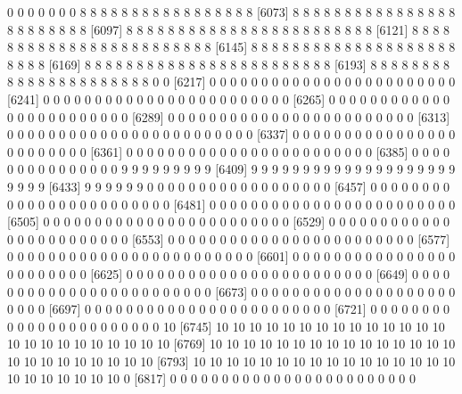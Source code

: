 \documentclass[11pt]{article}
\begin{document}
\begin{Schunk}
\begin{Soutput}
 [6049]  0  0  0  0  0  0  0  8  8  8  8  8  8  8  8  8  8  8  8  8  8  8  8  8
 [6073]  8  8  8  8  8  8  8  8  8  8  8  8  8  8  8  8  8  8  8  8  8  8  8  8
 [6097]  8  8  8  8  8  8  8  8  8  8  8  8  8  8  8  8  8  8  8  8  8  8  8  8
 [6121]  8  8  8  8  8  8  8  8  8  8  8  8  8  8  8  8  8  8  8  8  8  8  8  8
 [6145]  8  8  8  8  8  8  8  8  8  8  8  8  8  8  8  8  8  8  8  8  8  8  8  8
 [6169]  8  8  8  8  8  8  8  8  8  8  8  8  8  8  8  8  8  8  8  8  8  8  8  8
 [6193]  8  8  8  8  8  8  8  8  8  8  8  8  8  8  8  8  8  8  8  8  8  8  0  0
 [6217]  0  0  0  0  0  0  0  0  0  0  0  0  0  0  0  0  0  0  0  0  0  0  0  0
 [6241]  0  0  0  0  0  0  0  0  0  0  0  0  0  0  0  0  0  0  0  0  0  0  0  0
 [6265]  0  0  0  0  0  0  0  0  0  0  0  0  0  0  0  0  0  0  0  0  0  0  0  0
 [6289]  0  0  0  0  0  0  0  0  0  0  0  0  0  0  0  0  0  0  0  0  0  0  0  0
 [6313]  0  0  0  0  0  0  0  0  0  0  0  0  0  0  0  0  0  0  0  0  0  0  0  0
 [6337]  0  0  0  0  0  0  0  0  0  0  0  0  0  0  0  0  0  0  0  0  0  0  0  0
 [6361]  0  0  0  0  0  0  0  0  0  0  0  0  0  0  0  0  0  0  0  0  0  0  0  0
 [6385]  0  0  0  0  0  0  0  0  0  0  0  0  0  0  0  9  9  9  9  9  9  9  9  9
 [6409]  9  9  9  9  9  9  9  9  9  9  9  9  9  9  9  9  9  9  9  9  9  9  9  9
 [6433]  9  9  9  9  9  9  0  0  0  0  0  0  0  0  0  0  0  0  0  0  0  0  0  0
 [6457]  0  0  0  0  0  0  0  0  0  0  0  0  0  0  0  0  0  0  0  0  0  0  0  0
 [6481]  0  0  0  0  0  0  0  0  0  0  0  0  0  0  0  0  0  0  0  0  0  0  0  0
 [6505]  0  0  0  0  0  0  0  0  0  0  0  0  0  0  0  0  0  0  0  0  0  0  0  0
 [6529]  0  0  0  0  0  0  0  0  0  0  0  0  0  0  0  0  0  0  0  0  0  0  0  0
 [6553]  0  0  0  0  0  0  0  0  0  0  0  0  0  0  0  0  0  0  0  0  0  0  0  0
 [6577]  0  0  0  0  0  0  0  0  0  0  0  0  0  0  0  0  0  0  0  0  0  0  0  0
 [6601]  0  0  0  0  0  0  0  0  0  0  0  0  0  0  0  0  0  0  0  0  0  0  0  0
 [6625]  0  0  0  0  0  0  0  0  0  0  0  0  0  0  0  0  0  0  0  0  0  0  0  0
 [6649]  0  0  0  0  0  0  0  0  0  0  0  0  0  0  0  0  0  0  0  0  0  0  0  0
 [6673]  0  0  0  0  0  0  0  0  0  0  0  0  0  0  0  0  0  0  0  0  0  0  0  0
 [6697]  0  0  0  0  0  0  0  0  0  0  0  0  0  0  0  0  0  0  0  0  0  0  0  0
 [6721]  0  0  0  0  0  0  0  0  0  0  0  0  0  0  0  0  0  0  0  0  0  0  0 10
 [6745] 10 10 10 10 10 10 10 10 10 10 10 10 10 10 10 10 10 10 10 10 10 10 10 10
 [6769] 10 10 10 10 10 10 10 10 10 10 10 10 10 10 10 10 10 10 10 10 10 10 10 10
 [6793] 10 10 10 10 10 10 10 10 10 10 10 10 10 10 10 10 10 10 10 10 10 10 10  0
 [6817]  0  0  0  0  0  0  0  0  0  0  0  0  0  0  0  0  0  0  0  0  0  0  0  0

\end{Soutput}
\end{Schunk}
\end{document}
